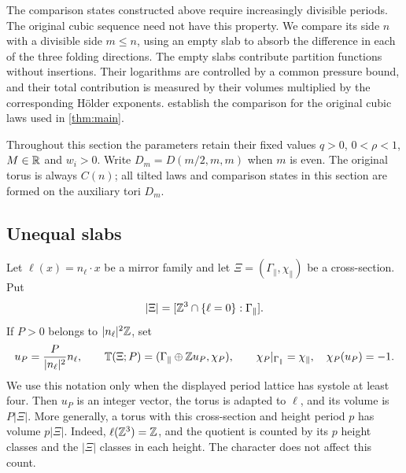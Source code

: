 The comparison states constructed above require increasingly divisible
periods. The original cubic sequence need not have this property.
We compare its side $n$ with a divisible side $m\le n$, using an
empty slab to absorb the difference in each of the three folding
directions. The empty slabs contribute partition functions without
insertions. Their logarithms are controlled by a common pressure
bound, and their total contribution is measured by their volumes
multiplied by the corresponding H\"older exponents.
 establish the
comparison for the original cubic laws used in \cref{thm:main}.

Throughout this section the parameters retain their fixed values
$q>0$, $0<\rho<1$, $M\in\mathbb R$ and $w_i>0$. Write
$D_m=D(m/2,m,m)$ when $m$ is even. The original torus is always
$C(n)$; all tilted laws and comparison states in this section are
formed on the auxiliary tori $D_m$.

\subsection{Unequal slabs}\label{sec:unequal-heights}

Let $\ell(x)=n_\ell\cdot x$ be a mirror family and let
$\Xi=(\Gamma_\parallel,\chi_\parallel)$ be a cross-section. Put
\[
 |\Xi|=[\mathbb Z^3\cap\{\ell=0\}:\Gamma_\parallel].
\]
If $P>0$ belongs to $|n_\ell|^2\mathbb Z$, set
\[
 u_P=\frac{P}{|n_\ell|^2}n_\ell,\qquad
 \mathbb T(\Xi;P)=
   (\Gamma_\parallel\oplus\mathbb Z u_P,\chi_P),
 \qquad \chi_P|_{\Gamma_\parallel}=\chi_\parallel,
 \quad\chi_P(u_P)=-1.
\]
We use this notation only when the displayed period lattice has systole
at least four. Then $u_P$ is an integer vector, the torus is adapted
to $\ell$, and its volume is $P|\Xi|$. More generally, a torus with
this cross-section and height period $p$ has volume $p|\Xi|$.
Indeed, $\ell(\mathbb Z^3)=\mathbb Z$, and the quotient is counted by its $p$
height classes and the $|\Xi|$ classes in each height. The character
does not affect this count.

